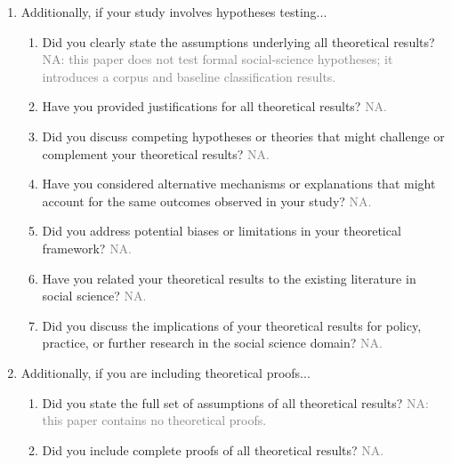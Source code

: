 \documentclass[letterpaper]{article} %
\newcommand{\answerNA}[1]{\textcolor{gray}{#1}}
\begin{document}
\begin{enumerate}
\item Additionally, if your study involves hypotheses testing...
\begin{enumerate}
  \item Did you clearly state the assumptions underlying all theoretical results?
    \answerNA{NA: this paper does not test formal social-science hypotheses; it introduces a corpus and baseline classification results.}
  \item Have you provided justifications for all theoretical results?
    \answerNA{NA.}
  \item Did you discuss competing hypotheses or theories that might challenge or complement your theoretical results?
    \answerNA{NA.}
  \item Have you considered alternative mechanisms or explanations that might account for the same outcomes observed in your study?
    \answerNA{NA.}
  \item Did you address potential biases or limitations in your theoretical framework?
    \answerNA{NA.}
  \item Have you related your theoretical results to the existing literature in social science?
    \answerNA{NA.}
  \item Did you discuss the implications of your theoretical results for policy, practice, or further research in the social science domain?
    \answerNA{NA.}
\end{enumerate}

\item Additionally, if you are including theoretical proofs...
\begin{enumerate}
  \item Did you state the full set of assumptions of all theoretical results?
    \answerNA{NA: this paper contains no theoretical proofs.}
	\item Did you include complete proofs of all theoretical results?
    \answerNA{NA.}
\end{enumerate}


\end{enumerate}
\end{document}
